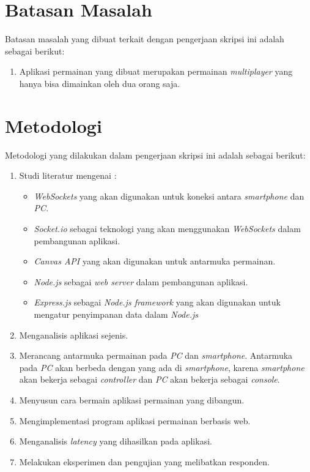 \section{Batasan Masalah}
\label{sec:batasan}

Batasan masalah yang dibuat terkait dengan pengerjaan skripsi ini adalah sebagai berikut:

\begin{enumerate}
	\item Aplikasi permainan yang dibuat merupakan permainan \textit{multiplayer} yang hanya bisa dimainkan oleh dua orang saja.
\end{enumerate}


\section{Metodologi}
\label{sec:metlit}
Metodologi yang dilakukan dalam pengerjaan skripsi ini adalah sebagai berikut:

\begin{enumerate}
	\item Studi literatur mengenai :
		\begin{itemize}
			\item \textit{WebSockets} yang akan digunakan untuk koneksi antara \textit{smartphone} dan \textit{PC}.
			\item \textit{Socket.io} sebagai teknologi yang akan menggunakan \textit{WebSockets} dalam pembangunan aplikasi.
			\item \textit{Canvas API} yang akan digunakan untuk antarmuka permainan.
			\item \textit{Node.js} sebagai \textit{web server} dalam pembangunan aplikasi. 	
			\item \textit{Express.js} sebagai \textit{Node.js framework} yang akan digunakan untuk mengatur penyimpanan data dalam \textit{Node.js}
		\end{itemize}
	\item Menganalisis aplikasi sejenis.
	\item Merancang antarmuka permainan pada \textit{PC} dan \textit{smartphone}. Antarmuka pada \textit{PC} akan berbeda dengan yang ada di \textit{smartphone}, karena \textit{smartphone} akan bekerja sebagai \textit{controller} dan \textit{PC} akan bekerja sebagai \textit{console}.
	\item Menyusun cara bermain aplikasi permainan yang dibangun.
	\item Mengimplementasi program aplikasi permainan berbasis web.
	\item Menganalisis \textit{latency} yang dihasilkan pada aplikasi.
	\item Melakukan eksperimen dan pengujian yang melibatkan responden.
\end{enumerate}

